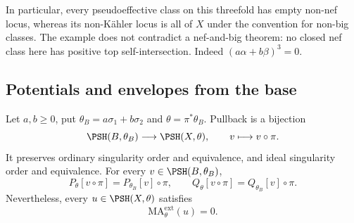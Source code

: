 In particular, every pseudoeffective class on this threefold has empty non-nef locus, whereas its non-K\"ahler locus is all of $X$ under the convention for non-big classes. The example does not contradict a nef-and-big theorem: no closed nef class here has positive top self-intersection. Indeed $(a\alpha+b\beta)^3=0$.

\subsection{Potentials and envelopes from the base}

\begin{proposition}\label{prop:elliptic-potential-descent}
Let $a,b\geq0$, put $\theta_B=a\sigma_1+b\sigma_2$ and $\theta=\pi^*\theta_B$. Pullback is a bijection
\[
 \PSH(B,\theta_B)\longrightarrow\PSH(X,\theta),\qquad v\longmapsto v\circ\pi.
\]
It preserves ordinary singularity order and equivalence, and ideal singularity order and equivalence. For every $v\in\PSH(B,\theta_B)$,
\[
 P_\theta[v\circ\pi]=P_{\theta_B}[v]\circ\pi,
 \qquad Q_\theta[v\circ\pi]=Q_{\theta_B}[v]\circ\pi.
\]
Nevertheless, every $u\in\PSH(X,\theta)$ satisfies
\[
 \mathrm{MA}^{\mathrm{ext}}_\theta(u)=0.
\]
\end{proposition}
